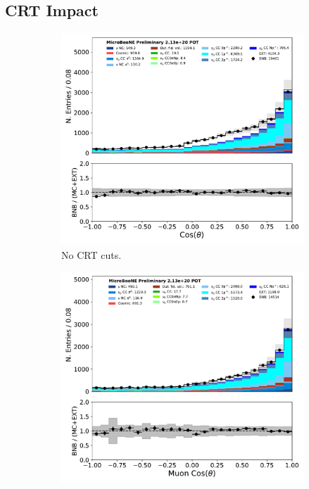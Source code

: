 \subsection{CRT Impact}
\label{ssec:Appendix:numu:CRTimpact}
\begin{figure}[hbt!] 
\begin{center}
    \begin{subfigure}[b]{0.35\textwidth}
        \centering
        \includegraphics[width=1.00\textwidth]{NuMuCCsel/Images/Ryan/Run3_nocrt/trk_cos_theta_08052020_fullsel_samples_event_category_noCRT.pdf}
        \caption{No CRT cuts.}
        \label{fig:NuMUCCsel:ryan:run3_costheta_withCRT}
    \end{subfigure}
    \begin{subfigure}[b]{0.35\textwidth}
        \centering
        \includegraphics[width=1.00\textwidth]{NuMuCCsel/Images/Ryan/fullselection_run3_fullsystematics/trk_cos_theta_v_07232020_fullsel_samples_detsys_event_category.pdf}

\end{subfigure}
\end{center}
\end{figure}
